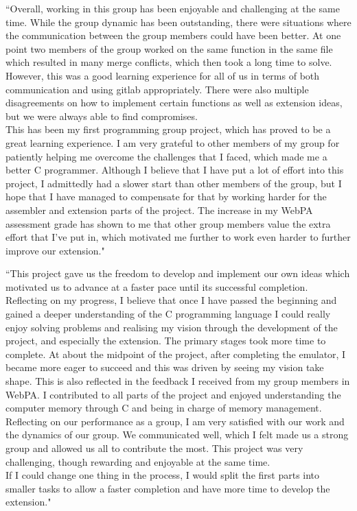 \documentclass[11pt]{article}
\newenvironment{myquote}%
  {\list{}{\leftmargin=0.0in\rightmargin=0.0in}\item[]}%
  {\endlist}
\begin{document}
\begin{myquote}
``Overall, working in this group has been enjoyable and challenging at the same time. While the group dynamic has been outstanding, there were situations where the communication between the group members could have been better. At one point two members of the group worked on the same function in the same file which resulted in many merge conflicts, which then took a long time to solve. However, this was a good learning experience for all of us in terms of both communication and using gitlab appropriately. There were also multiple disagreements on how to implement certain functions as well as extension ideas, but we were always able to find compromises.
\\This has been my first programming group project, which has proved to be a great learning experience.  I am very grateful to other members of my group for patiently helping me overcome the challenges that I faced, which made me a better C programmer. Although I believe that I have put a lot of effort into this project, I admittedly had a slower start than other members of the group, but I hope that I have managed to compensate for that by working harder for the assembler and extension parts of the project. The increase in my WebPA assessment grade has shown to me that other group members value the extra effort that I've put in, which motivated me further to work even harder to further improve our extension."
\end{myquote}


\begin{myquote}
``This project gave us the freedom to develop and implement our own ideas which motivated us to advance at a faster pace until its successful completion.
\\
Reflecting on my progress, I believe that once I have passed the beginning and gained a deeper understanding of the C programming language I could really enjoy solving problems and realising my vision through the development of the project, and especially the extension. The primary stages took more time to complete. At about the midpoint of the project, after completing the emulator, I became more eager to succeed and this was driven by seeing my vision take shape. This is also reflected in the feedback I received from my group members in WebPA. I contributed to all parts of the project and enjoyed understanding the computer memory through C and being in charge of memory management.
\\
Reflecting on our performance as a group, I am very satisfied with our work and the dynamics of our group. We communicated well, which I felt made us a strong group and allowed us all to contribute the most. This project was very challenging, though rewarding and enjoyable at the same time.
\\
If I could change one thing in the process, I would split the first parts into smaller tasks to allow a faster completion and have more time to develop the extension."

\end{myquote}
\end{document}
